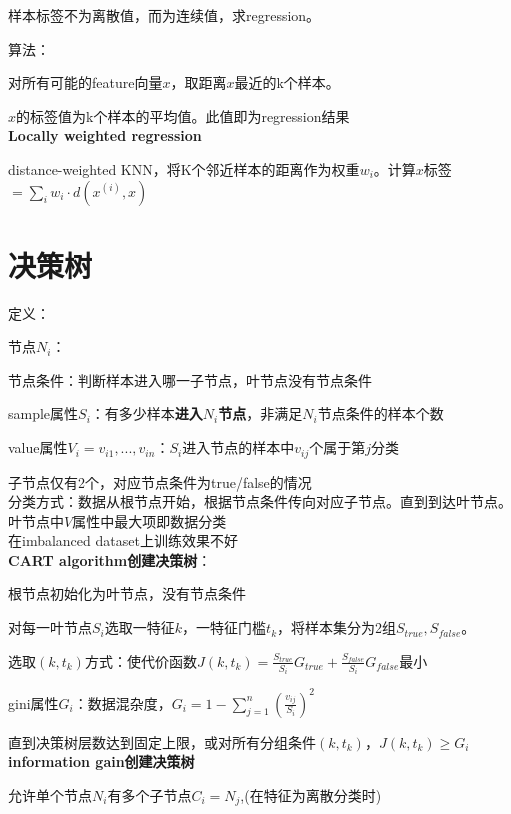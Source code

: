 \documentclass[UTF8]{ctexart}
\begin{document}
  样本标签不为离散值，而为连续值，求regression。

  算法：

  \quad 对所有可能的feature向量$x$，取距离$x$最近的k个样本。
  
  \quad $x$的标签值为k个样本的平均值。此值即为regression结果\\
\textbf{Locally weighted regression}

  distance-weighted KNN，将K个邻近样本的距离作为权重$w_i$。计算$x$标签$ = \sum_i w_i \cdot d(x^{(i)}, x)$



\section{决策树}
\noindent 定义：

  节点$N_i$：

  \quad 节点条件：判断样本进入哪一子节点，叶节点没有节点条件
  
  \quad sample属性$S_i$：有多少样本\textbf{进入$N_i$节点}，非满足$N_i$节点条件的样本个数

  \quad value属性$V_i = v_{i1}, ..., v_{in}$：$S_i$进入节点的样本中$v_{ij}$个属于第$j$分类
  
  \quad 子节点仅有2个，对应节点条件为true/false的情况\\
分类方式：数据从根节点开始，根据节点条件传向对应子节点。直到到达叶节点。叶节点中$V$属性中最大项即数据分类\\
在imbalanced dataset上训练效果不好\\
\textbf{CART algorithm创建决策树}：

  根节点初始化为叶节点，没有节点条件
  
  对每一叶节点$S_i$选取一特征$k$，一特征门槛$t_k$，将样本集分为2组$S_{true}, S_{false}$。
  
  \quad 选取$(k, t_k)$方式：使代价函数$J(k, t_k) = \frac{S_{true}}{S_i}G_{true} + \frac{S_{false}}{S_i}G_{false}$最小

  \quad gini属性$G_i$：数据混杂度，$G_i = 1-\sum_{j=1}^{n}(\frac{v_{ij}}{S_i})^2$

  直到决策树层数达到固定上限，或对所有分组条件$(k, t_k)$，$J(k, t_k) \geq G_i$\\
\textbf{information gain创建决策树}

  允许单个节点$N_i$有多个子节点$C_i = {N_j}$,(在特征为离散分类时)
\end{document}
